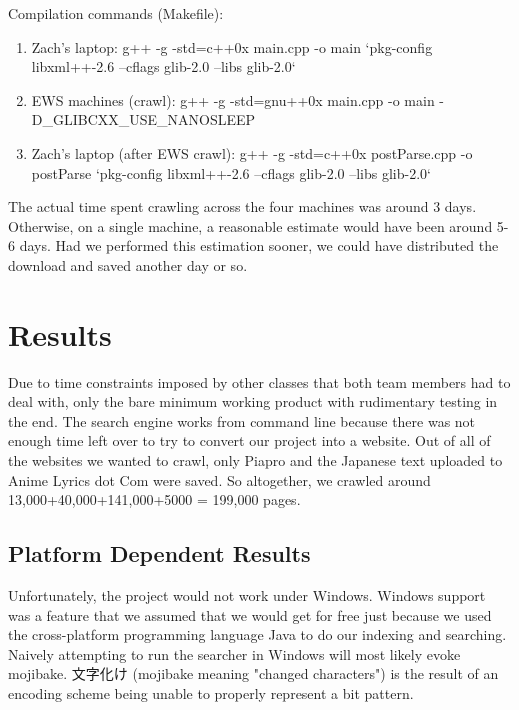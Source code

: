 \documentclass{acm} %
\begin{document}
\begin{CJK}{UTF8}{zhsong}
Compilation commands (Makefile):

\begin{enumerate}
 \item Zach's laptop: g++ -g -std=c++0x main.cpp -o main `pkg-config libxml++-2.6 --cflags glib-2.0 --libs glib-2.0`
 \item EWS machines (crawl): g++ -g -std=gnu++0x main.cpp -o main -D\_GLIBCXX\_USE\_NANOSLEEP
 \item Zach's laptop (after EWS crawl): g++ -g -std=c++0x postParse.cpp -o postParse `pkg-config libxml++-2.6 --cflags glib-2.0 --libs glib-2.0`
\end{enumerate}

The actual time spent crawling across the four machines was around 3 days. Otherwise, on a single machine, a reasonable estimate would have been around 5-6 days. Had we performed this estimation sooner, we could have distributed the download and saved another day or so.

\section{Results}

Due to time constraints imposed by other classes that both team members had to deal with, only the bare minimum working product with rudimentary testing in the end. The search engine works from command line because there was not enough time left over to try to convert our project into a website. Out of all of the websites we wanted to crawl, only Piapro and the Japanese text uploaded to Anime Lyrics dot Com were saved. So altogether, we crawled around 13,000+40,000+141,000+5000 = 199,000 pages.

\subsection{Platform Dependent Results}

Unfortunately, the project would not work under Windows. Windows support was a feature that we assumed that we would get for free just because we used the cross-platform programming language Java to do our indexing and searching. Naively attempting to run the searcher in Windows will most likely evoke mojibake. 文字化け (mojibake meaning "changed characters") is the result of an encoding scheme being unable to properly represent a bit pattern.


\end{CJK}
\end{document}
